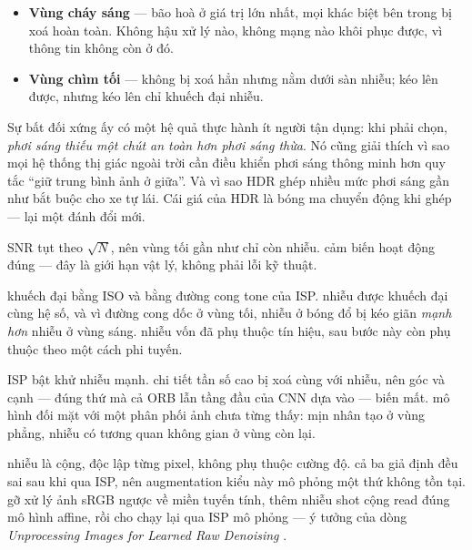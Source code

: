 \documentclass[../../../deep_learning.tex]{subfiles}
\begin{document}
\begin{itemize}
\item \textbf{Vùng cháy sáng} --- bão hoà ở giá trị lớn nhất, mọi khác biệt bên trong bị xoá hoàn toàn. Không hậu xử lý nào, không mạng nào khôi phục được, vì thông tin không còn ở đó.
\item \textbf{Vùng chìm tối} --- không bị xoá hẳn nhưng nằm dưới sàn nhiễu; kéo lên được, nhưng kéo lên chỉ khuếch đại nhiễu.
\end{itemize}

Sự bất đối xứng ấy có một hệ quả thực hành ít người tận dụng: khi phải chọn, \emph{phơi sáng thiếu một chút an toàn hơn phơi sáng thừa}. Nó cũng giải thích vì sao mọi hệ thống thị giác ngoài trời cần điều khiển phơi sáng thông minh hơn quy tắc ``giữ trung bình ảnh ở giữa''. Và vì sao HDR ghép nhiều mức phơi sáng gần như bắt buộc cho xe tự lái. Cái giá của HDR là bóng ma chuyển động khi ghép --- lại một đánh đổi mới.

\begin{mach}
\item {} \hq SNR tụt theo \(\sqrt{N}\), nên vùng tối gần như chỉ còn nhiễu. \gd cảm biến hoạt động đúng --- đây là giới hạn vật lý, không phải lỗi kỹ thuật.
\item {} \gp khuếch đại bằng ISO và bằng đường cong tone của ISP. \gia nhiễu được khuếch đại cùng hệ số, và vì đường cong  dốc ở vùng tối, nhiễu ở bóng đổ bị kéo giãn \emph{mạnh hơn} nhiễu ở vùng sáng. \vdm nhiễu vốn đã phụ thuộc tín hiệu, sau bước này còn phụ thuộc theo một cách phi tuyến.
\item {} \gp ISP bật khử nhiễu mạnh. \gia chi tiết tần số cao bị xoá cùng với nhiễu, nên góc và cạnh --- đúng thứ mà cả ORB lẫn tầng đầu của CNN dựa vào --- biến mất. \vdm mô hình đối mặt với một phân phối ảnh chưa từng thấy: mịn nhân tạo ở vùng phẳng, nhiễu có tương quan không gian ở vùng còn lại.
\item {} \gd nhiễu là cộng, độc lập từng pixel, không phụ thuộc cường độ. \hq cả ba giả định đều sai sau khi qua ISP, nên augmentation kiểu này mô phỏng một thứ không tồn tại. \gp gỡ xử lý ảnh sRGB ngược về miền tuyến tính, thêm nhiễu shot cộng read đúng mô hình affine, rồi cho chạy lại qua ISP mô phỏng --- ý tưởng của dòng \emph{Unprocessing Images for Learned Raw Denoising} \cite{brooks2019unprocessing}.
\end{mach}
\end{document}
